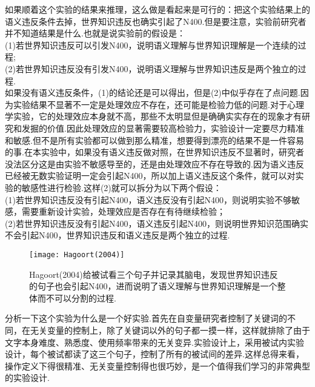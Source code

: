 \begin{kaobox}[frametitle=问题：如果这个实验只保留世界知识违反和正常条件，可行吗？]
如果顺着这个实验的结果来推理，这么做是看起来是可行的：把这个实验结果上的语义违反条件去掉，世界知识违反也确实引起了N400.但是要注意，实验前研究者并不知道结果是什么.也就是说实验前的假设是：\\
(1)若世界知识违反可以引发N400，说明语义理解与世界知识理解是一个连续的过程;\\
(2)若世界知识违反没有引发N400，说明语义理解与世界知识违反是两个独立的过程.\\
如果没有语义违反条件，(1)的结论还是可以得出，但是(2)中似乎存在了点问题.因为实验结果不显著不一定是处理效应不存在，还可能是检验力低的问题.对于心理学实验，它的处理效应本身就不高，那些不太明显但是确确实实存在的现象才有研究和发掘的价值.因此处理效应的显著需要较高检验力，实验设计一定要尽力精准和敏感.但不是所有实验都可以做到那么精准，想要得到漂亮的结果不是一件容易的事.在本实验中，如果没有语义违反做对照，在世界知识违反不显著时，研究者没法区分这是由实验不敏感导至的，还是由处理效应不存在导致的.因为语义违反已经被无数实验证明一定会引起N400，所以加上语义违反这个条件，就可以对实验的敏感性进行检验.这样(2)就可以拆分为以下两个假设：\\
(1)若世界知识违反没有引起N400，语义违反没有引起N400，则说明实验不够敏感，需要重新设计实验，处理效应是否存在有待继续检验；\\
(2)若世界知识违反没有引起N400，语义违反引起N400，则说明世界知识范围确实不会引起N400，世界知识违反和语义违反是两个独立的过程.
\end{kaobox}

\begin{figure}
    \texttt{[image: Hagoort(2004)]}
    \caption[Hagoort(2004)]{Hagoort(2004)给被试看三个句子并记录其脑电，发现世界知识违反的句子也会引起N400，进而说明了语义理解与世界知识理解是一个整体而不可以分割的过程.}
\end{figure}

分析一下这个实验为什么是一个好实验.首先在自变量研究者控制了关键词的不同，在无关变量的控制上，除了关键词以外的句子都一摸一样，这样就排除了由于文字本身难度、熟悉度、使用频率带来的无关变异.实验设计上，采用被试内实验设计，每个被试都读了这三个句子，控制了所有的被试间的差异.这样总得来看，操作定义下得很精准、无关变量控制得也很巧妙，是一个值得我们学习的非常典型的实验设计.